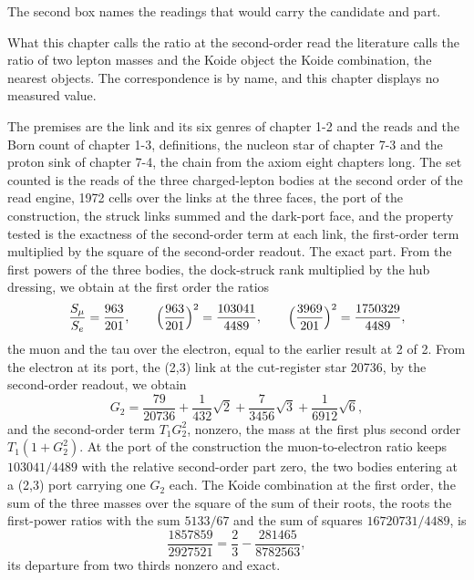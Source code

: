The second box names the readings that would carry the candidate and part.
\begin{chbridge}
What this chapter calls the ratio at the second-order read the literature calls the ratio of two lepton masses and the Koide object the Koide combination, the nearest objects. The correspondence is by name, and this chapter displays no measured value.
\end{chbridge}
\begin{chproof}[exact]
The premises are the link and its six genres of chapter 1-2 and the reads and the Born count of chapter 1-3, definitions, the nucleon star of chapter 7-3 and the proton sink of chapter 7-4, the chain from the axiom eight chapters long. The set counted is the reads of the three charged-lepton bodies at the second order of the read engine, 1972 cells over the links at the three faces, the port of the construction, the struck links summed and the dark-port face, and the property tested is the exactness of the second-order term at each link, the first-order term multiplied by the square of the second-order readout. The exact part. From the first powers of the three bodies, the dock-struck rank multiplied by the hub dressing, we obtain at the first order the ratios
\begin{equation}
\frac{S_\mu}{S_e} = \frac{963}{201}, \qquad \Bigl(\frac{963}{201}\Bigr)^{2} = \frac{103041}{4489}, \qquad \Bigl(\frac{3969}{201}\Bigr)^{2} = \frac{1750329}{4489},
\end{equation}
the muon and the tau over the electron, equal to the earlier result at 2 of 2. From the electron at its port, the (2,3) link at the cut-register star 20736, by the second-order readout, we obtain
\begin{equation}
G_{2} = \frac{79}{20736} + \frac{1}{432}\sqrt{2} + \frac{7}{3456}\sqrt{3} + \frac{1}{6912}\sqrt{6} ,
\end{equation}
and the second-order term $T_{1} G_{2}^{2}$, nonzero, the mass at the first plus second order $T_{1}(1 + G_{2}^{2})$. At the port of the construction the muon-to-electron ratio keeps $103041/4489$ with the relative second-order part zero, the two bodies entering at a (2,3) port carrying one $G_{2}$ each. The Koide combination at the first order, the sum of the three masses over the square of the sum of their roots, the roots the first-power ratios with the sum $5133/67$ and the sum of squares $16720731/4489$, is
\begin{equation}
\frac{1857859}{2927521} = \frac{2}{3} - \frac{281465}{8782563} ,
\end{equation}
its departure from two thirds nonzero and exact.
\end{chproof}

